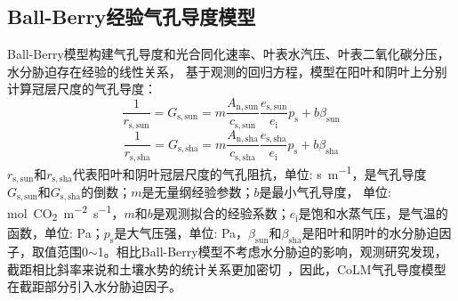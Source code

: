 \subsection{Ball-Berry经验气孔导度模型}



Ball-Berry模型构建气孔导度和光合同化速率、叶表水汽压、叶表二氧化碳分压，水分胁迫存在经验的线性关系，
基于观测的回归方程，模型在阳叶和阴叶上分别计算冠层尺度的气孔导度：
\begin{equation}\label{rs_a1sun}
\frac{1}{r_{\mathrm{s,sun}}}=G_{\mathrm{s,sun}}=m \frac{A_{\mathrm{n,sun}}}{c_{\mathrm{s,sun}}} \frac{e_{\mathrm{s,sun}}}{e_{\mathrm{i}}} p_{\mathrm{s}}+b\beta_{\mathrm{sun}}
\end{equation}
\begin{equation}\label{rs_a1sha}
\frac{1}{r_{\mathrm{s,sha}}}=G_{\mathrm{s,sha}}=m \frac{A_{\mathrm{n,sha}}}{c_{\mathrm{s,sha}}} \frac{e_{\mathrm{s,sha}}}{e_{\mathrm{i}}} p_{\mathrm{s}}+b\beta_{\mathrm{sha}}
\end{equation}
$r_{\mathrm{s,sun}}$和$r_{\mathrm{s,sha}}$代表阳叶和阴叶冠层尺度的气孔阻抗，单位: \unit{s.m^{-1}}，是气孔导度$G_{\mathrm{s,sun}}$和$G_{\mathrm{s,sha}}$的倒数；$m$是无量纲经验参数；$b$是最小气孔导度，
单位: \unit{mol.CO_2.m^{-2}.s^{-1}}，$m$和$b$是观测拟合的经验系数；$e_{\mathrm {i}}$是饱和水蒸气压，是气温的函数，单位: Pa；$p_{\mathrm {s}}$是大气压强，单位: Pa，$\beta_{\mathrm{sun}}$和$\beta_{\mathrm{sha}}$是阳叶和阴叶的水分胁迫因子，取值范围0$\sim$1。相比Ball-Berry模型不考虑水分胁迫的影响，观测研究发现，截距相比斜率来说和土壤水势的统计关系更加密切~\citep{Misson2004,Medlyn2011}，因此，CoLM气孔导度模型在截距部分引入水分胁迫因子。


